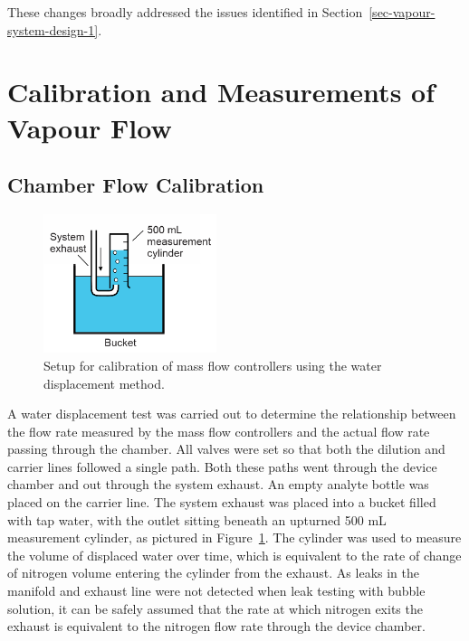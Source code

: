 \documentclass[
  a4paper,
]{scrbook}
\begin{document}
These changes broadly addressed the issues identified in
Section~\ref{sec-vapour-system-design-1}.

\hypertarget{sec-calibration}{%
\section{Calibration and Measurements of Vapour
Flow}\label{sec-calibration}}

\hypertarget{chamber-flow-calibration}{%
\subsection{Chamber Flow Calibration}\label{chamber-flow-calibration}}

\begin{figure}

{\centering \includegraphics[width=0.45\textwidth,height=\textheight]{figures/ch5/water_displacement.png}

}

\caption{\label{fig-water-displacement}Setup for calibration of mass
flow controllers using the water displacement method.}

\end{figure}

A water displacement test was carried out to determine the relationship
between the flow rate measured by the mass flow controllers and the
actual flow rate passing through the chamber. All valves were set so
that both the dilution and carrier lines followed a single path. Both
these paths went through the device chamber and out through the system
exhaust. An empty analyte bottle was placed on the carrier line. The
system exhaust was placed into a bucket filled with tap water, with the
outlet sitting beneath an upturned 500 mL measurement cylinder, as
pictured in Figure~\ref{fig-water-displacement}. The cylinder was used
to measure the volume of displaced water over time, which is equivalent
to the rate of change of nitrogen volume entering the cylinder from the
exhaust. As leaks in the manifold and exhaust line were not detected
when leak testing with bubble solution, it can be safely assumed that
the rate at which nitrogen exits the exhaust is equivalent to the
nitrogen flow rate through the device chamber.
\end{document}
